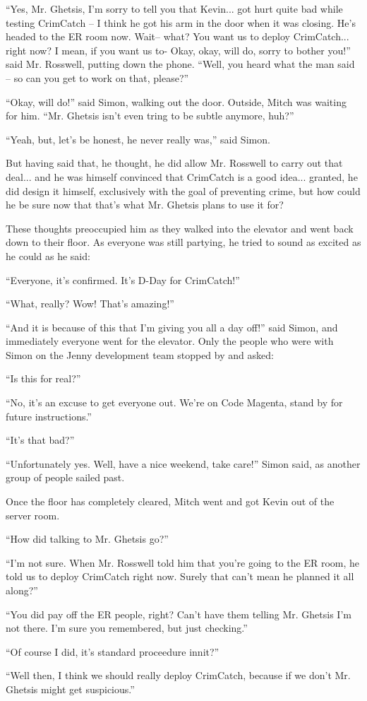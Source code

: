 \documentclass[10pt,a4paper]{article}
\newcommand{\lang}[2]{ #2 \par}
\newcommand{\ainame}{Jenny}
\newcommand{\mainname}{Simon}
\newcommand{\auxname}{Mitch}
\newcommand{\ceoname}{Mr. Rosswell}
\newcommand{\policename}{Mr. Ghetsis}
\newcommand{\featurename}{CrimCatch}
\newcommand{\criminalname}{Kevin}
\begin{document}
\noindent\makebox[\linewidth]{\rule{\paperwidth}{0.4pt}}

\lang{...}{``Yes, \policename{}, I'm sorry to tell you that \criminalname{}... got hurt quite bad while testing \featurename{} -- I think he got his arm in the door when it was closing. He's headed to the ER room now. Wait-- what? You want us to deploy \featurename{}... right now? I mean, if you want us to- Okay, okay, will do, sorry to bother you!'' said \ceoname{}, putting down the phone. ``Well, you heard what the man said -- so can you get to work on that, please?''}
\lang{...}{``Okay, will do!'' said \mainname{}, walking out the door. Outside, \auxname{} was waiting for him. ``\policename{} isn't even tring to be subtle anymore, huh?''}
\lang{...}{``Yeah, but, let's be honest, he never really was,'' said \mainname{}.}
\lang{...}{But having said that, he thought, he did allow \ceoname{} to carry out that deal... and he was himself convinced that \featurename{} is a good idea... granted, he did design it himself, exclusively with the goal of preventing crime, but how could he be sure now that that's what \policename{} plans to use it for?}
\lang{...}{These thoughts preoccupied him as they walked into the elevator and went back down to their floor. As everyone was still partying, he tried to sound as excited as he could as he said:}
\lang{...}{``Everyone, it's confirmed. It's D-Day for \featurename{}!''}
\lang{...}{``What, really? Wow! That's amazing!''}
\lang{...}{``And it is because of this that I'm giving you all a day off!'' said \mainname{}, and immediately everyone went for the elevator. Only the people who were with \mainname{} on the \ainame{} development team stopped by and asked: }
\lang{...}{``Is this for real?''}
\lang{...}{``No, it's an excuse to get everyone out. We're on Code Magenta, stand by for future instructions.''}
\lang{...}{``It's that bad?''}
\lang{...}{``Unfortunately yes. Well, have a nice weekend, take care!'' \mainname{} said, as another group of people sailed past.}
\lang{...}{Once the floor has completely cleared, \auxname{} went and got \criminalname{} out of the server room.}
\lang{...}{``How did talking to \policename{} go?''}
\lang{...}{``I'm not sure. When \ceoname{} told him that you're going to the ER room, he told us to deploy \featurename{} right now. Surely that can't mean he planned it all along?''}
\lang{...}{``You did pay off the ER people, right? Can't have them telling \policename{} I'm not there. I'm sure you remembered, but just checking.''}
\lang{...}{``Of course I did, it's standard proceedure innit?''}
\lang{...}{``Well then, I think we should really deploy \featurename{}, because if we don't \policename{} might get suspicious.''}
\end{document}
